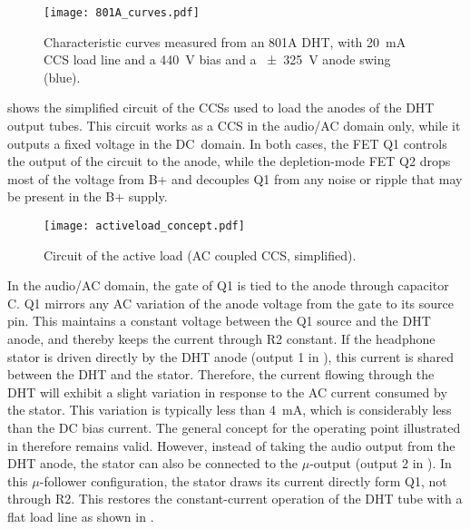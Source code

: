 \begin{figure}
\begin{center}
\texttt{[image: 801A\_curves.pdf]}
\caption{Characteristic curves measured from an 801A DHT, with \SI{20}{mA} CCS load line and a \SI{440}{V} bias and a \SI{\pm325}{V} anode swing (blue).}
\end{center}
\end{figure}

 shows the simplified circuit of the CCSs used to load the anodes of the DHT output tubes. This circuit works as a CCS in the audio/AC domain only, while it outputs a fixed voltage in the DC domain. In both cases, the FET Q1 controls the output of the circuit to the anode, while the depletion-mode FET Q2 drops most of the voltage from B+ and decouples Q1 from any noise or ripple that may be present in the B+ supply.\par

\begin{figure}
\begin{center}
\texttt{[image: activeload\_concept.pdf]}
\caption{Circuit of the active load (AC coupled CCS, simplified).}
\end{center}
\end{figure}

In the audio/AC domain, the gate of Q1 is tied to the anode through capacitor C. Q1 mirrors any AC variation of the anode voltage from the gate to its source pin. This maintains a constant voltage between the Q1 source and the DHT anode, and thereby keeps the current through R2 constant. If the headphone stator is driven directly by the DHT anode (output 1 in ), this current is shared between the DHT and the stator. Therefore, the current flowing through the DHT will exhibit a slight variation in response to the AC current consumed by the stator. This variation is typically less than \SI{4}{mA}\cite{osdeha_p8}, which is considerably less than the DC bias current. The general concept for the operating point illustrated in  therefore remains valid. However, instead of taking the audio output from the DHT anode, the stator can also be connected to the $\mu$-output (output 2 in ). In this $\mu$-follower configuration\cite{pimm_ccs,kimmel_mustage}, the stator draws its current directly form Q1, not through R2.\cite{muresistorvalue} This restores the constant-current operation of the DHT tube with a flat load line as shown in .\par

